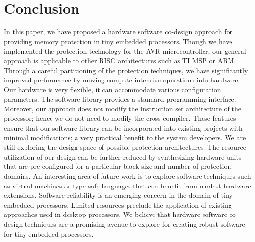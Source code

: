 \section{Conclusion}
\label{sec:conclude}
%
In this paper, we have proposed a hardware software co-design approach for providing memory protection in tiny embedded processors.
%
Though we have implemented the protection technology for the AVR microcontroller, our general approach is applicable to other RISC architectures such as TI MSP or ARM.
%
Through a careful partitioning of the protection techniques, we have significantly improved performance by moving compute intensive operations into hardware.
%
Our hardware is very flexible, it can accommodate various configuration parameters.
%
The software library provides a standard programming interface.
%
Moreover, our approach does not modify the instruction set architecture of the processor; hence we do not need to modify the cross compiler.
%
These features ensure that our software library can be incorporated into existing projects with minimal modifications; a very practical benefit to the system developers.
%
We are still exploring the design space of possible protection architectures.
%
The resource utilization of our design can be further reduced by synthesizing hardware units that are pre-configured for a particular block size and number of protection domains.
%
An interesting area of future work is to explore software techniques such as virtual machines or type-safe languages  that can benefit from modest hardware extensions.
%
Software reliability is an emerging concern in the domain of tiny embedded processors.
%
Limited resources preclude the application of existing approaches used in desktop processors.
%
We believe that hardware software co-design techniques are a promising avenue to explore for creating robust software for tiny embedded processors. 
